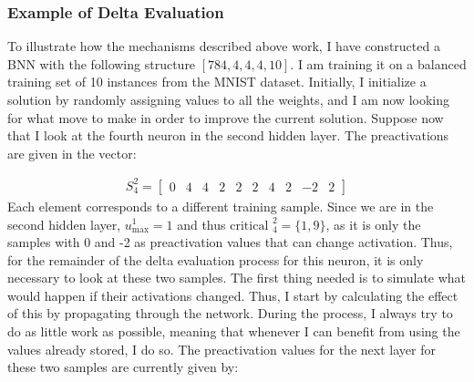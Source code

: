 \subsubsection{Example of Delta Evaluation}
To illustrate how the mechanisms described above work, I have constructed a BNN with the following structure $[784, 4, 4, 4, 10]$. I am training it on a balanced training set of 10 instances from the MNIST dataset. Initially, I initialize a solution by randomly assigning values to all the weights, and I am now looking for what move to make in order to improve the current solution. Suppose now that I look at the fourth neuron in the second hidden layer. The preactivations are given in the vector:

\begin{align*}
    S_4^2 = 
    \begin{bmatrix}
        0 & 4 & 4 & 2 & 2 & 2 & 4 & 2 & -2 & 2
    \end{bmatrix}
\end{align*}
Each element corresponds to a different training sample. Since we are in the second hidden layer, $u^1_{\max} = 1$ and thus $\text{critical }_4 ^2 = \{1, 9\}$, as it is only the samples with 0 and -2 as preactivation values that can change activation. Thus, for the remainder of the delta evaluation process for this neuron, it is only necessary to look at these two samples. The first thing needed is to simulate what would happen if their activations changed. Thus, I start by calculating the effect of this by propagating through the network. During the process, I always try to do as little work as possible, meaning that whenever I can benefit from using the values already stored, I do so. The preactivation values for the next layer for these two samples are currently given by:

